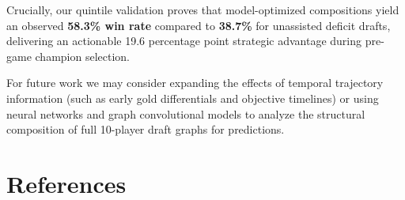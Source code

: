 \documentclass[11pt,letterpaper]{article}
\begin{document}
Crucially, our quintile validation proves that model-optimized compositions yield an observed \textbf{58.3\% win rate} compared to \textbf{38.7\%} for unassisted deficit drafts, delivering an actionable 19.6 percentage point strategic advantage during pre-game champion selection.

For future work we may consider expanding the effects of temporal trajectory information (such as early gold differentials and objective timelines) or using neural networks and graph convolutional models to analyze the structural composition of full 10-player draft graphs for predictions.

\clearpage

\section{References}
\vspace{1.5em}
\end{document}
